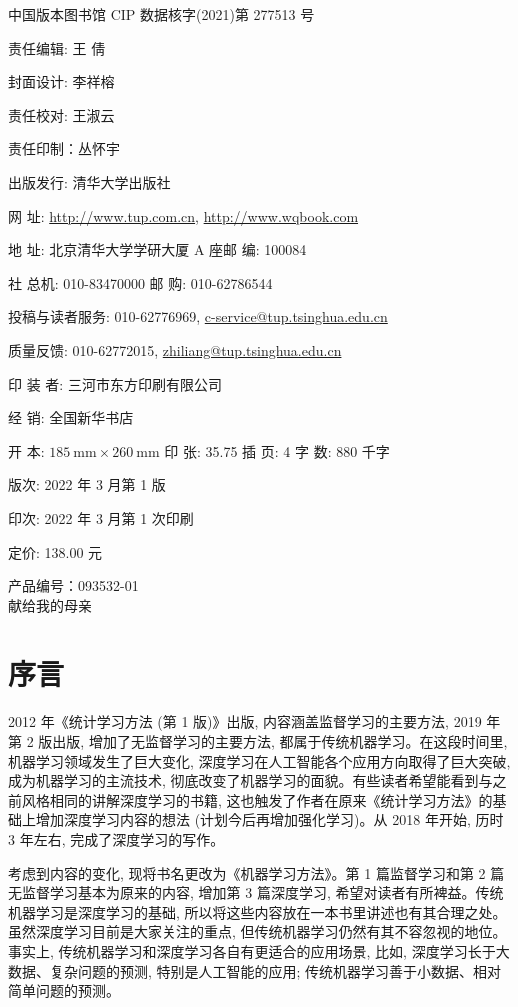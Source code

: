 \documentclass[10pt]{article}
\begin{document}
\begin{CJK*}{UTF8}{bsmi}
中国版本图书馆 CIP 数据核字(2021)第 277513 号

责任编辑: 王 倩

封面设计: 李祥榕

责任校对: 王淑云

责任印制：丛怀宇

出版发行: 清华大学出版社

网 址: \href{http://www.tup.com.cn}{http://www.tup.com.cn}, \href{http://www.wqbook.com}{http://www.wqbook.com}

地 址: 北京清华大学学研大厦 $\mathrm{A}$ 座邮 编: 100084

社 总机: 010-83470000 邮 购: 010-62786544

投稿与读者服务: 010-62776969, \href{mailto:c-service@tup.tsinghua.edu.cn}{c-service@tup.tsinghua.edu.cn}

质量反馈: 010-62772015, \href{mailto:zhiliang@tup.tsinghua.edu.cn}{zhiliang@tup.tsinghua.edu.cn}

印 装 者: 三河市东方印刷有限公司

经 销: 全国新华书店

开 本: $185 \mathrm{~mm} \times 260 \mathrm{~mm}$ 印 张: 35.75 插 页: 4 字 数: 880 千字

版次: 2022 年 3 月第 1 版

印次: 2022 年 3 月第 1 次印刷

定价: 138.00 元

产品编号：093532-01\\
献给我的母亲

\section*{序言}
2012 年《统计学习方法 (第 1 版)》出版, 内容涵盖监督学习的主要方法, 2019 年第 2 版出版, 增加了无监督学习的主要方法, 都属于传统机器学习。在这段时间里, 机器学习领域发生了巨大变化, 深度学习在人工智能各个应用方向取得了巨大突破, 成为机器学习的主流技术, 彻底改变了机器学习的面貌。有些读者希望能看到与之前风格相同的讲解深度学习的书籍, 这也触发了作者在原来《统计学习方法》的基础上增加深度学习内容的想法 (计划今后再增加强化学习)。从 2018 年开始, 历时 3 年左右, 完成了深度学习的写作。

考虑到内容的变化, 现将书名更改为《机器学习方法》。第 1 篇监督学习和第 2 篇无监督学习基本为原来的内容, 增加第 3 篇深度学习, 希望对读者有所裨益。传统机器学习是深度学习的基础, 所以将这些内容放在一本书里讲述也有其合理之处。虽然深度学习目前是大家关注的重点, 但传统机器学习仍然有其不容忽视的地位。事实上, 传统机器学习和深度学习各自有更适合的应用场景, 比如, 深度学习长于大数据、复杂问题的预测, 特别是人工智能的应用; 传统机器学习善于小数据、相对简单问题的预测。


\end{CJK*}
\end{document}
